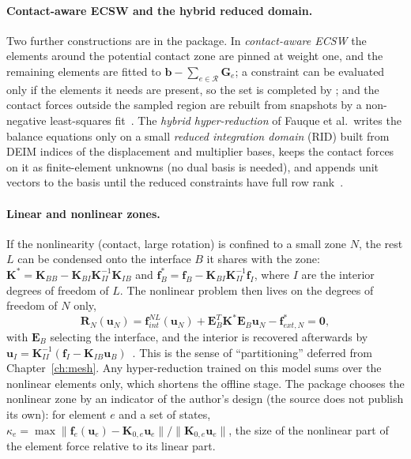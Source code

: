 \paragraph{Contact-aware ECSW and the hybrid reduced domain.}
Two further constructions are in the package. In \emph{contact-aware ECSW} the elements around the potential contact zone are pinned at weight one, and the remaining elements are fitted to $\bm b-\sum_{e\in\mathcal R}\bm G_e$; a constraint can be evaluated only if the elements it needs are present, so the set is completed by ; and the contact forces outside the sampled region are rebuilt from snapshots by a non-negative least-squares fit~\cite{fauque2018hybrid,nikiema2026assembly}. The \emph{hybrid hyper-reduction} of Fauque et al.\ writes the balance equations only on a small \emph{reduced integration domain} (RID) built from DEIM indices of the displacement and multiplier bases, keeps the contact forces on it as finite-element unknowns (no dual basis is needed), and appends unit vectors to the basis until the reduced constraints have full row rank~\cite{fauque2018hybrid}.


\paragraph{Linear and nonlinear zones.}
If the nonlinearity (contact, large rotation) is confined to a small zone $N$, the rest $L$ can be condensed onto the interface $B$ it shares with the zone: $\bm K^*=\bm K_{BB}-\bm K_{BI}\bm K_{II}^{-1}\bm K_{IB}$ and $\bm f_B^*=\bm f_B-\bm K_{BI}\bm K_{II}^{-1}\bm f_I$, where $I$ are the interior degrees of freedom of $L$. The nonlinear problem then lives on the degrees of freedom of $N$ only,
\begin{equation}\label{eq:hy-part}
\bm R_N(\bm u_N)=\bm f^{NL}_{int}(\bm u_N)+\bm E_B^T\bm K^*\bm E_B\bm u_N-\bm f^*_{ext,N}=\bm0,
\end{equation}
with $\bm E_B$ selecting the interface, and the interior is recovered afterwards by $\bm u_I=\bm K_{II}^{-1}(\bm f_I-\bm K_{IB}\bm u_B)$~\cite{nikiema2026assembly}. This is the sense of ``partitioning'' deferred from Chapter~\ref{ch:mesh}. Any hyper-reduction trained on this model sums over the nonlinear elements only, which shortens the offline stage. The package chooses the nonlinear zone by an indicator of the author's design (the source does not publish its own): for element $e$ and a set of states, $\kappa_e=\max\|\bm f_e(\bm u_e)-\bm K_{0,e}\bm u_e\|/\|\bm K_{0,e}\bm u_e\|$, the size of the nonlinear part of the element force relative to its linear part.

